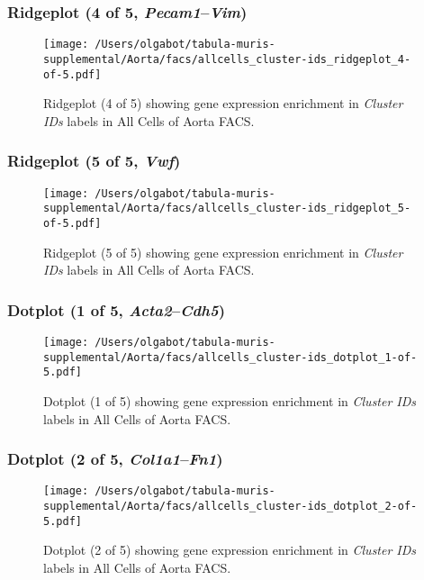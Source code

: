 \clearpage

\subsubsection{Ridgeplot (4 of 5, \emph{Pecam1}--\emph{Vim})}
\begin{figure}[h]
\centering
\texttt{[image: /Users/olgabot/tabula-muris-supplemental/Aorta/facs/allcells\_cluster-ids\_ridgeplot\_4-of-5.pdf]}

\caption{ Ridgeplot (4 of 5)  showing gene expression enrichment in \emph{Cluster IDs} labels in All Cells of Aorta FACS. }
\end{figure}


\clearpage

\subsubsection{Ridgeplot (5 of 5, \emph{Vwf})}
\begin{figure}[h]
\centering
\texttt{[image: /Users/olgabot/tabula-muris-supplemental/Aorta/facs/allcells\_cluster-ids\_ridgeplot\_5-of-5.pdf]}

\caption{ Ridgeplot (5 of 5)  showing gene expression enrichment in \emph{Cluster IDs} labels in All Cells of Aorta FACS. }
\end{figure}


\clearpage

\subsubsection{Dotplot (1 of 5, \emph{Acta2}--\emph{Cdh5})}
\begin{figure}[h]
\centering
\texttt{[image: /Users/olgabot/tabula-muris-supplemental/Aorta/facs/allcells\_cluster-ids\_dotplot\_1-of-5.pdf]}

\caption{ Dotplot (1 of 5)  showing gene expression enrichment in \emph{Cluster IDs} labels in All Cells of Aorta FACS. }
\end{figure}


\clearpage

\subsubsection{Dotplot (2 of 5, \emph{Col1a1}--\emph{Fn1})}
\begin{figure}[h]
\centering
\texttt{[image: /Users/olgabot/tabula-muris-supplemental/Aorta/facs/allcells\_cluster-ids\_dotplot\_2-of-5.pdf]}

\caption{ Dotplot (2 of 5)  showing gene expression enrichment in \emph{Cluster IDs} labels in All Cells of Aorta FACS. }
\end{figure}


